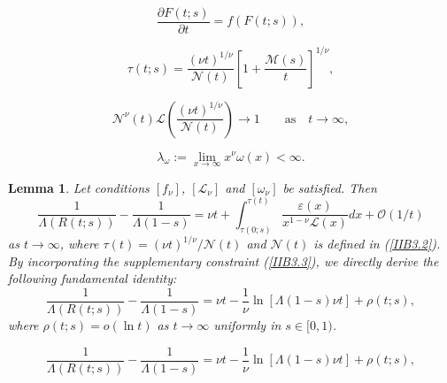 \documentclass[10pt,a4paper]{amsart}
\newtheorem{lemma}{Lemma}
\begin{document}
\begin{equation}                           \label{IIB2.2}
    \frac{\partial{F(t;s)}}{\partial{t}}=f\left(F(t;s)\right),
\end{equation}

\begin{equation}                              \label{IIB3.1}
    \tau(t;s)=\frac{{(\nu t)}^{1/{\nu}}}{\mathcal{N}(t)}{{\left[1+\frac{\mathcal{M}(s)}{t}\right]}^{1/{\nu}}},
\end{equation}

\begin{equation}                              \label{IIB3.2}
    {{\mathcal{N}}^{\nu}}(t)\mathcal{L}\left(\frac{{(\nu{t})}^{1/{\nu}}}{\mathcal{N}(t)}\right)\to{1}
    \qquad {\text{as}} \quad {t\to\infty},
\end{equation}

\begin{equation}                              \label{IIB3.3}
    {{\lambda}_{\omega}}:=\lim_{x\to\infty}{x^{\nu}}\omega(x)<\infty.
\end{equation}

\begin{lemma}                  \label{IIBLem1}
    Let conditions $[{f_{\nu}}]$, $[{{\mathcal{L}}_{\nu}}]$ and $[{{\omega}_{\nu}}]$ be satisfied. Then
\begin{equation}                              \label{IIB3.4}
    \frac{1}{\Lambda(R(t;s))}-\frac{1}{\Lambda(1-s)}=\nu{t}+
    \int_{\tau(0;s)}^{\tau(t)}{\frac{\varepsilon(x)}{{x^{1-\nu}}\mathcal{L}(x)}dx}+
    \mathcal{O}\left(1/t\right)
\end{equation}
    as $t\to\infty$, where $\tau(t)={{(\nu{t})}^{1/\nu}}\big/{\mathcal{N}(t)}$ and $\mathcal{N}(t)$ is defined
    in {(\ref{IIB3.2})}. By incorporating the supplementary constraint {(\ref{IIB3.3})}, we directly derive the
    following fundamental identity:
\begin{equation}                              \label{IIB3.5}
    \frac{1}{\Lambda(R(t;s))}-\frac{1}{\Lambda(1-s)}=\nu{t}-\frac{1}{\nu}\ln\left[\Lambda(1-s)\nu{t}\right]+\rho(t;s),
\end{equation}
    where $\rho(t;s)=o(\ln{t})$ as $t\to\infty$ uniformly in $s\in[0,1)$.
\end{lemma}

\begin{equation}                              
    \frac{1}{\Lambda(R(t;s))}-\frac{1}{\Lambda(1-s)}=\nu{t}-\frac{1}{\nu}\ln\left[\Lambda(1-s)\nu{t}\right]+\rho(t;s),
\end{equation}
\end{document}
